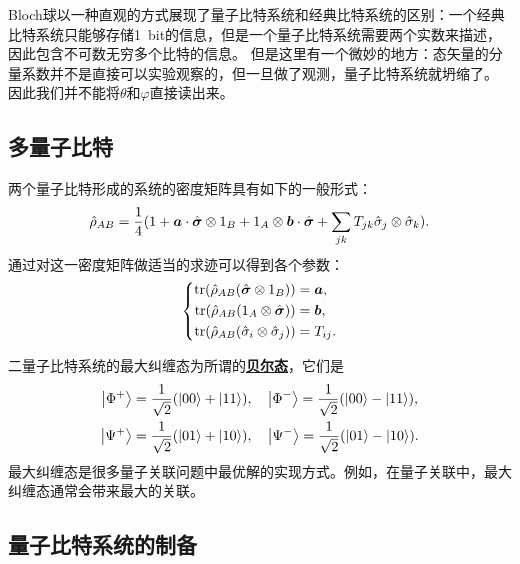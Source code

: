 \documentclass[hyperref, UTF8, a4paper]{ctexart}
\newcommand*{\concept}[1]{\underline{\textbf{#1}}}
\begin{document}
Bloch球以一种直观的方式展现了量子比特系统和经典比特系统的区别：一个经典比特系统只能够存储\SI{1}{bit}的信息，但是一个量子比特系统需要两个实数来描述，因此包含不可数无穷多个比特的信息。
但是这里有一个微妙的地方：态矢量的分量系数并不是直接可以实验观察的，但一旦做了观测，量子比特系统就坍缩了。
因此我们并不能将$\theta$和$\varphi$直接读出来。

\subsection{多量子比特}

两个量子比特形成的系统的密度矩阵具有如下的一般形式：
\begin{equation}
    \hat{\rho}_{AB} = \frac{1}{4} (1 + \vb*{a} \cdot \hat{\vb*{\sigma}} \otimes 1_B + 1_A \otimes \vb*{b} \cdot \hat{\vb*{\sigma}} + \sum_{jk} T_{jk} \hat{\sigma}_j \otimes \hat{\sigma}_k ).
\end{equation}
通过对这一密度矩阵做适当的求迹可以得到各个参数：
\begin{equation}
    \left\{
        \begin{aligned}
            \trace (\hat{\rho}_{AB} (\hat{\vb*{\sigma}} \otimes 1_B)) &= \vb*{a}, \\
            \trace (\hat{\rho}_{AB} (1_A \otimes \hat{\vb*{\sigma}})) &= \vb*{b}, \\
            \trace (\hat{\rho}_{AB} (\hat{\sigma}_i \otimes \hat{\sigma}_j) ) &= T_{ij}.
        \end{aligned}
    \right.
\end{equation}

二量子比特系统的最大纠缠态为所谓的\concept{贝尔态}，它们是
\begin{equation}
    \begin{aligned}
        \ket{\Phi^+} &= \frac{1}{\sqrt{2}} (\ket{00} + \ket{11}), \quad \ket{\Phi^-} = \frac{1}{\sqrt{2}} (\ket{00} - \ket{11}), \\
        \ket{\Psi^+} &= \frac{1}{\sqrt{2}} (\ket{01} + \ket{10}), \quad \ket{\Psi^-} = \frac{1}{\sqrt{2}} (\ket{01} - \ket{10}).
    \end{aligned}
\end{equation}
最大纠缠态是很多量子关联问题中最优解的实现方式。例如，在量子关联中，最大纠缠态通常会带来最大的关联。

\subsection{量子比特系统的制备}
\end{document}
